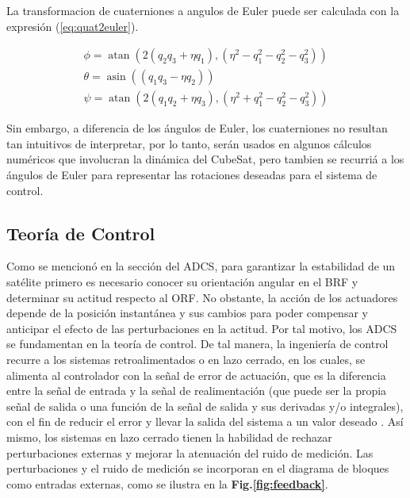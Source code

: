 La transformacion de cuaterniones a angulos de Euler puede ser calculada con la expresión (\ref{eq:quat2euler}).

\begin{equation}
	\begin{gathered}
		\phi=\operatorname{atan}\left(2\left(q_2 q_3+\eta q_1\right),\left(\eta^2-q_1^2-q_2^2-q_3^2\right)\right) \\
		\theta=\operatorname{asin}\left(\left(q_1 q_3-\eta q_2\right)\right) \\
		\psi=\operatorname{atan}\left(2\left(q_1 q_2+\eta q_3\right),\left(\eta^2+q_1^2-q_2^2-q_3^2\right)\right)
	\end{gathered}\label{eq:quat2euler}
\end{equation}

Sin embargo, a diferencia de los ángulos de Euler, los cuaterniones no resultan tan intuitivos de interpretar, por lo tanto, serán usados en algunos cálculos numéricos que involucran la dinámica del CubeSat, pero tambien se recurriá a los ángulos de Euler para representar las rotaciones deseadas para el sistema de control.



\subsection{Teoría de Control}
Como se mencionó en la sección del ADCS, para garantizar la estabilidad de un satélite primero es necesario conocer su orientación angular en el BRF y determinar su actitud respecto al ORF. No obstante, la acción de los actuadores depende de la posición instantánea y sus cambios para poder compensar y anticipar el efecto de las perturbaciones en la actitud. Por tal motivo, los ADCS se fundamentan en la teoría de control.
De tal manera, la ingeniería de control recurre a los sistemas retroalimentados o en lazo cerrado, en los cuales, se alimenta al controlador con la señal de error de actuación, que es la diferencia entre la señal de entrada y la señal de realimentación (que puede ser la propia señal de salida o una función de la señal de salida y sus derivadas y/o integrales), con el fin de reducir el error y llevar la salida del sistema a un valor deseado \cite{ogata2010modern}. 
Así mismo, los sistemas en lazo cerrado tienen la habilidad de rechazar perturbaciones externas y mejorar la atenuación del ruido de medición. Las perturbaciones y el ruido de medición se incorporan en el diagrama de bloques como entradas externas, como se ilustra en la \textbf{Fig.\ref{fig:feedback}}.



